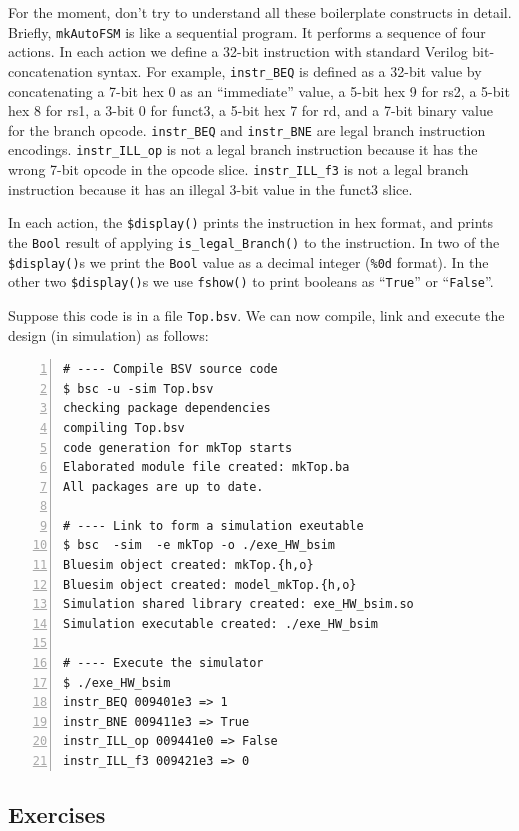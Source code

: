 For the moment, don't try to understand all these boilerplate
constructs in detail.  Briefly, \verb|mkAutoFSM| is like a sequential
program.  It performs a sequence of four actions.  In each action we
define a 32-bit instruction with standard Verilog bit-concatenation
syntax.  For example, \verb|instr_BEQ| is defined as a 32-bit value by
concatenating a 7-bit hex 0 as an ``immediate'' value, a 5-bit hex 9
for rs2, a 5-bit hex 8 for rs1, a 3-bit 0 for funct3, a 5-bit hex 7
for rd, and a 7-bit binary value for the branch opcode.
\verb|instr_BEQ| and \verb|instr_BNE| are legal branch instruction
encodings.  \verb|instr_ILL_op| is not a legal branch instruction
because it has the wrong 7-bit opcode in the opcode slice.
\verb|instr_ILL_f3| is not a legal branch instruction because it has
an illegal 3-bit value in the funct3 slice.

In each action, the \verb|$display()| prints the instruction in hex
format, and prints the \verb|Bool| result of applying
\verb|is_legal_Branch()| to the instruction.  In two of the
\verb|$display()|s we print the \verb|Bool| value as a decimal integer
(\verb|%0d| format).  In the other two \verb|$display()|s we use
\verb|fshow()| to print booleans as ``\verb|True|'' or
``\verb|False|''.

Suppose this code is in a file \verb|Top.bsv|.  We can now compile,
link and execute the design (in simulation) as follows:

\begin{Verbatim}[frame=single, numbers=left]
# ---- Compile BSV source code
$ bsc -u -sim Top.bsv
checking package dependencies
compiling Top.bsv
code generation for mkTop starts
Elaborated module file created: mkTop.ba
All packages are up to date.

# ---- Link to form a simulation exeutable
$ bsc  -sim  -e mkTop -o ./exe_HW_bsim
Bluesim object created: mkTop.{h,o}
Bluesim object created: model_mkTop.{h,o}
Simulation shared library created: exe_HW_bsim.so
Simulation executable created: ./exe_HW_bsim

# ---- Execute the simulator
$ ./exe_HW_bsim
instr_BEQ 009401e3 => 1
instr_BNE 009411e3 => True
instr_ILL_op 009441e0 => False
instr_ILL_f3 009421e3 => 0
\end{Verbatim}


\subsection{Exercises}

